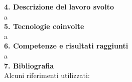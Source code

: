 \documentclass[11pt]{report}
\begin{document}
	\pagebreak
	\noindent\textbf{\large 4. Descrizione del lavoro svolto} \\
	\newline 
	a \\
	\newline
	\noindent\textbf{\large 5. Tecnologie coinvolte} \\
	\newline 
	a \\
	\newline
	\noindent\textbf{\large 6. Competenze e risultati raggiunti} \\
	\newline 
	a \\
	\newline
	\noindent\textbf{\large 7. Bibliografia} \\
	\newline 
	Alcuni riferimenti utilizzati: \\ 
	\newline
	
	
	
	
\end{document}
